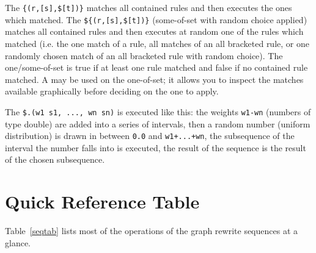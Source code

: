 The  \verb/{(r,[s],$[t])}/ matches all contained rules and then executes the ones which matched.
The  \verb/${(r,[s],$[t])}/ (some-of-set with random choice applied) matches all contained rules and then executes at random one of the rules which matched
(i.e. the one match of a rule, all matches of an all bracketed rule, or one randomly chosen match of an all bracketed rule with random choice).
The one/some-of-set is true if at least one rule matched and false if no contained rule matched.
A  may be used on the one-of-set; it allows you to inspect the matches available graphically before deciding on the one to apply. 

The  \verb/$.(w1 s1, ..., wn sn)/ is executed like this:
the weights \texttt{w1-wn} (numbers of type double) are added into a series of intervals,
then a random number (uniform distribution) is drawn in between \texttt{0.0} and \texttt{w1+...+wn},
the subsequence of the interval the number falls into is executed,
the result of the sequence is the result of the chosen subsequence.


\section{Quick Reference Table}

Table~\ref{seqtab} lists most of the operations of the graph rewrite sequences at a glance.

